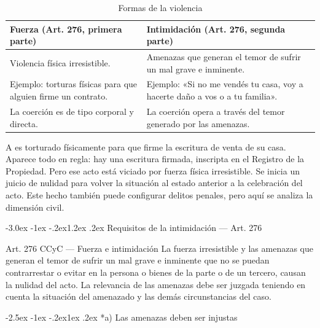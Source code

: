 \documentclass[12pt,oneside]{book}
\makeatletter
\renewcommand\section{\@startsection{section}{1}{\z@}%
  {-3.0ex \@plus -1ex \@minus -.2ex}{1.2ex \@plus .2ex}%
  {\normalfont\large\bfseries\color{acento}}}
\renewcommand\subsection{\@startsection{subsection}{2}{\z@}%
  {-2.5ex \@plus -1ex \@minus -.2ex}{1ex \@plus .2ex}%
  {\normalfont\normalsize\bfseries}}
\makeatother
\begin{document}
\begin{table}[H]
\centering
\begin{tabularx}{\textwidth}{>{\raggedright\arraybackslash}X >{\raggedright\arraybackslash}X}
\toprule
\textbf{Fuerza (Art. 276, primera parte)} & \textbf{Intimidación (Art. 276, segunda parte)} \\
\midrule
Violencia física irresistible. & Amenazas que generan el temor de sufrir un mal grave e inminente. \\[4pt]
Ejemplo: torturas físicas para que alguien firme un contrato. & Ejemplo: «Si no me vendés tu casa, voy a hacerte daño a vos o a tu familia». \\[4pt]
La coerción es de tipo corporal y directa. & La coerción opera a través del temor generado por las amenazas. \\
\bottomrule
\end{tabularx}
\caption{Formas de la violencia}
\end{table}

\begin{ejemplo}
A es torturado físicamente para que firme la escritura de venta de su casa. Aparece todo en regla: hay una escritura firmada, inscripta en el Registro de la Propiedad. Pero ese acto está viciado por fuerza física irresistible. Se inicia un juicio de nulidad para volver la situación al estado anterior a la celebración del acto. Este hecho también puede configurar delitos penales, pero aquí se analiza la dimensión civil.
\end{ejemplo}

\section{Requisitos de la intimidación --- Art. 276}

\begin{articulo}{Art. 276 CCyC --- Fuerza e intimidación}
La fuerza irresistible y las amenazas que generan el temor de sufrir un mal grave e inminente que no se puedan contrarrestar o evitar en la persona o bienes de la parte o de un tercero, causan la nulidad del acto. La relevancia de las amenazas debe ser juzgada teniendo en cuenta la situación del amenazado y las demás circunstancias del caso.
\end{articulo}

\subsection*{a) Las amenazas deben ser injustas}
\end{document}
